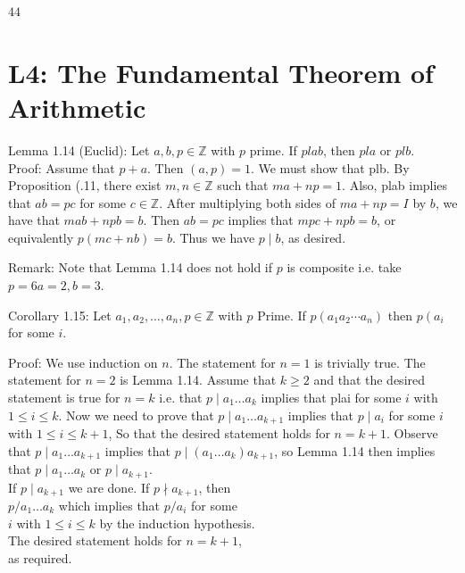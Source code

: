 \documentclass[10pt]{article}
\begin{document}
$44$

\section*{L4: The Fundamental Theorem of Arithmetic}
Lemma 1.14 (Euclid): Let $a, b, p \in \mathbb{Z}$ with $p$ prime. If $p l a b$, then $p l a$ or $p l b$.\\
Proof: Assume that $p+a$. Then $(a, p)=1$. We must show that plb. By Proposition (.11, there exist $m, n \in \mathbb{Z}$ such that $m a+n p=1$. Also, plab implies that $a b=p c$ for some $c \in \mathbb{Z}$. After multiplying both sides of $m a+n p=I$ by $b$, we have that $m a b+n p b=b$. Then $a b=p c$ implies that $m p c+n p b=b$, or equivalently $p(m c+n b)=b$. Thus we have $p \mid b$, as desired.

Remark: Note that Lemma 1.14 does not hold if $p$ is composite i.e. take $p=6 a=2, b=3$.

Corollary 1.15: Let $a_{1}, a_{2}, \ldots, a_{n}, p \in \mathbb{Z}$ with $p$ Prime. If $p\left(a_{1} a_{2} \cdots a_{n}\right)$ then $p\left(a_{i}\right.$ for some $i$.

Proof: We use induction on $n$. The statement for $n=1$ is trivially true. The statement for $n=2$ is Lemma 1.14. Assume that $k \geqslant 2$ and that the desired statement is true for $n=k$ i.e. that $p \mid a_{1} \ldots a_{k}$ implies that plai for some $i$ with $1 \leqslant i \leqslant k$. Now we need to prove that $p \mid a_{1} \ldots a_{k+1}$ implies that $p \mid a_{i}$ for some $i$ with $1 \leq i \leq k+1$, So that the desired statement holds for $n=k+1$. Observe that $p \mid a_{1} \ldots a_{k+1}$ implies that $p \mid\left(a_{1} \ldots a_{k}\right) a_{k+1}$, so Lemma 1.14 then implies that $p \mid a_{1} \ldots a_{k}$ or $p \mid a_{k+1}$.\\
If $p \mid a_{k+1}$ we are done. If $p \nmid a_{k+1}$, then\\
$p / a_{1} \ldots a_{k}$ which implies that $p / a_{i}$ for some\\
$i$ with $1 \leq i \leq k$ by the induction hypothesis.\\
The desired statement holds for $n=k+1$,\\
as required.
\end{document}
